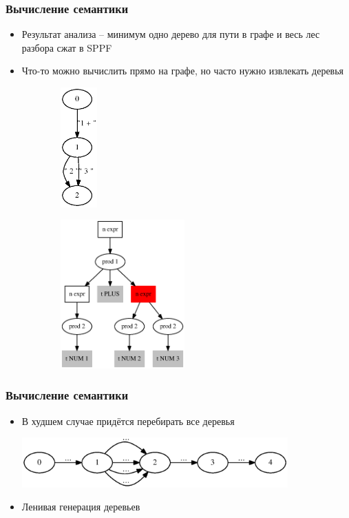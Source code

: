 \documentclass{beamer}
\begin{document}
\begin{frame}[fragile]
	\transwipe[direction=90]
	\frametitle{Вычисление семантики}
    \begin{itemize}
        \item Результат анализа -- минимум одно дерево для пути в графе и весь лес разбора сжат в SPPF
        \item Что-то можно вычислить прямо на графе, но часто нужно извлекать деревья
    \end{itemize}
    
    \begin{figure}[h]
        \begin{subfigure}[h]{0.33\textwidth}
            \includegraphics[width=40pt]{picts/before_tokenization.eps}
        \end{subfigure}
        \qquad \qquad
        \begin{subfigure}[h]{0.33\textwidth}
            \includegraphics[width=135pt]{picts/Calc_sppf.eps}
        \end{subfigure}
    \end{figure}
\end{frame}


\begin{frame}[fragile]
	\transwipe[direction=90]
	\frametitle{Вычисление семантики}
    \begin{itemize}
        \item В худшем случае придётся перебирать все деревья
        \begin{center}
            \includegraphics[width=290pt]{picts/Bad_case.eps}
        \end{center}
        \item Ленивая генерация деревьев
    \end{itemize}
\end{frame}
\end{document}
